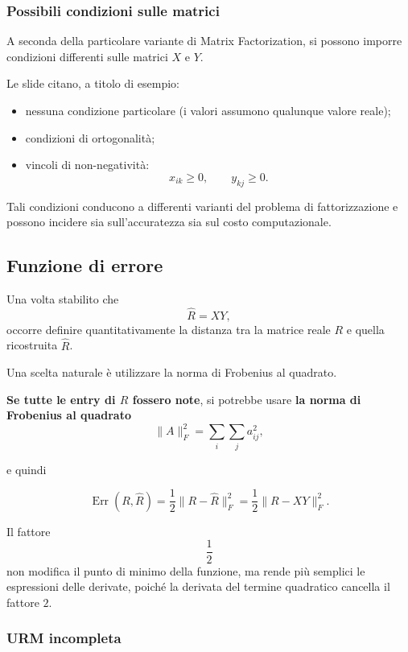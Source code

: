 \subsubsection{Possibili condizioni sulle matrici}

A seconda della particolare variante di Matrix Factorization, si possono imporre condizioni differenti sulle matrici $X$ e $Y$.

Le slide citano, a titolo di esempio:
\begin{itemize}
    \item nessuna condizione particolare (i valori assumono qualunque valore reale);
    \item condizioni di ortogonalità;
    \item vincoli di non-negatività:
    \[
    x_{ik}\geq 0,
    \qquad
    y_{kj}\geq 0.
    \]
\end{itemize}

Tali condizioni conducono a differenti varianti del problema di fattorizzazione e possono incidere sia sull'accuratezza sia sul costo computazionale.

\subsection{Funzione di errore}

Una volta stabilito che
\[
\widehat R=XY,
\]
occorre definire quantitativamente la distanza tra la matrice reale $R$ e quella ricostruita $\widehat R$.

Una scelta naturale è utilizzare la norma di Frobenius al quadrato.

\textbf{Se tutte le entry di $R$ fossero note}, si potrebbe usare \textbf{la norma di Frobenius al quadrato}
\[
\lVert A\rVert_F^2
=
\sum_i\sum_j a_{ij}^{2},
\]

e quindi

\begin{equation*}
\operatorname{Err}(R,\widehat R)
=
\frac{1}{2}
\lVert R-\widehat R\rVert_F^2
=
\frac{1}{2}
\lVert R-XY\rVert_F^2.
\end{equation*}


Il fattore
\[
\frac{1}{2}
\]
non modifica il punto di minimo della funzione, ma rende più semplici le espressioni delle derivate, poiché la derivata del termine quadratico cancella il fattore $2$.

\subsubsection{URM incompleta}

